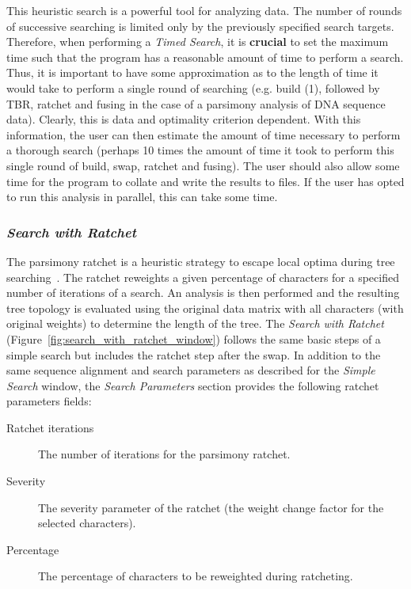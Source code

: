 {This heuristic search is a powerful tool for analyzing data. The
number of rounds of successive searching is limited only by the
previously specified search targets. Therefore, when performing a
\emph{Timed Search}, it is {\bf crucial} to set the maximum time
such that the program has a reasonable amount of time to perform a
search.  Thus, it is important to have some approximation as to the
length of time it would take to perform a single round of searching
(e.g. build (1), followed by TBR, ratchet and fusing in the case
of a parsimony analysis of DNA sequence data).  Clearly, this is
data and optimality criterion dependent.  With this information,
the user can then estimate the amount of time necessary to perform
a thorough search (perhaps 10 times the amount of time it took to
perform this single round of build, swap, ratchet and fusing).  The
user should also allow some time for the program to collate and
write the results to files.  If the user has opted to run this
analysis in parallel, this can take some time.

\subsubsection*{\emph{Search with Ratchet}}

The parsimony ratchet is a heuristic strategy to escape  local
optima during tree searching~\cite{Nixon1999}. The ratchet reweights
a given percentage of characters for a specified number of iterations
of a search. An analysis is then performed and the resulting tree
topology is evaluated using the original data matrix with all
characters (with original weights) to determine the length of the
tree. The \emph{Search with Ratchet}
(Figure~\ref{fig:search_with_ratchet_window}) follows the same basic
steps of a simple search but includes the ratchet step after the
swap. In addition to the same sequence alignment and search parameters
as described for the \emph{Simple Search} window, the \emph{Search
Parameters} section provides the following ratchet parameters fields:


\begin{description}
\item[Ratchet iterations] The number of iterations for the parsimony
ratchet.
\item[Severity] The severity parameter of the ratchet (the weight
change factor for the selected characters).
\item[Percentage] The percentage of characters to be reweighted during 
ratcheting.
\end{description}

}
